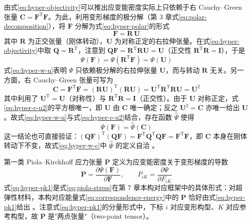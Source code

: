 由式\eqref{eq:hyper-objectivity}可以推出应变能密度实际上只依赖于右 Cauchy--Green 张量 $\mathbf{C}=\mathbf{F}^{\mathrm{T}}\mathbf{F}$。为此，利用变形梯度的极分解（第 3 章式\eqref{eq:polar-decomposition}），将 $\mathbf{F}$ 分解为式\eqref{eq:hyper-polar}的形式
\begin{equation}
  \mathbf{F}=\mathbf{R}\,\mathbf{U}
  \label{eq:hyper-polar}
\end{equation}
其中 $\mathbf{R}$ 为正交张量（刚体转动），$\mathbf{U}$ 为对称正定的右拉伸张量。在式\eqref{eq:hyper-objectivity}中取 $\mathbf{Q}=\mathbf{R}^{\mathrm{T}}$，注意到 $\mathbf{Q}\mathbf{F}=\mathbf{R}^{\mathrm{T}}\mathbf{R}\mathbf{U}=\mathbf{U}$（正交性 $\mathbf{R}^{\mathrm{T}}\mathbf{R}=\mathbf{I}$），于是
\begin{equation}
  \Psi(\mathbf{F})=\Psi(\mathbf{R}^{\mathrm{T}}\mathbf{F})=\Psi(\mathbf{U})
  \label{eq:hyper-w-u}
\end{equation}
式\eqref{eq:hyper-w-u}表明 $\Psi$ 只依赖极分解的右拉伸张量 $\mathbf{U}$，而与转动 $\mathbf{R}$ 无关。另一方面，右 Cauchy--Green 张量可写为
\begin{equation}
  \mathbf{C}=\mathbf{F}^{\mathrm{T}}\mathbf{F}=(\mathbf{R}\mathbf{U})^{\mathrm{T}}(\mathbf{R}\mathbf{U})
  =\mathbf{U}^{\mathrm{T}}\mathbf{R}^{\mathrm{T}}\mathbf{R}\mathbf{U}=\mathbf{U}^{2}
  \label{eq:hyper-c-u2}
\end{equation}
其中利用了 $\mathbf{U}^{\mathrm{T}}=\mathbf{U}$（对称性）与 $\mathbf{R}^{\mathrm{T}}\mathbf{R}=\mathbf{I}$（正交性）。由于 $\mathbf{U}$ 对称正定，式\eqref{eq:hyper-c-u2}的平方根唯一，即 $\mathbf{U}$ 由 $\mathbf{C}$ 唯一确定；反之 $\mathbf{U}^{2}=\mathbf{C}$ 亦唯一给出 $\mathbf{U}$。故式\eqref{eq:hyper-w-u}与式\eqref{eq:hyper-c-u2}结合，存在函数 $\hat{\Psi}$ 使得
\begin{equation}
  \Psi(\mathbf{F})=\hat{\Psi}(\mathbf{C})
  \label{eq:hyper-w-c}
\end{equation}
这一结论也可直接验证：$(\mathbf{Q}\mathbf{F})^{\mathrm{T}}(\mathbf{Q}\mathbf{F})=\mathbf{F}^{\mathrm{T}}\mathbf{Q}^{\mathrm{T}}\mathbf{Q}\mathbf{F}=\mathbf{F}^{\mathrm{T}}\mathbf{F}$，即 $\mathbf{C}$ 本身在刚体转动下不变，故式\eqref{eq:hyper-w-c}中 $\hat{\Psi}$ 的定义自洽 \cite{Ogden1997}。

第一类 Piola--Kirchhoff 应力张量 $\mathbf{P}$ 定义为应变能密度关于变形梯度的导数
\begin{equation}
  \mathbf{P}=\frac{\partial\Psi(\mathbf{F})}{\partial\mathbf{F}},
  \qquad
  P_{iK}=\frac{\partial\Psi}{\partial F_{iK}}
  \label{eq:hyper-pk1}
\end{equation}
式\eqref{eq:hyper-pk1}是式\eqref{eq:piola-stress}在第 7 章本构对应框架中的具体形式：对超弹性材料，本构对应能量式\eqref{eq:correspondence-energy}中的 $\mathbf{P}$ 恰好由式\eqref{eq:hyper-pk1}给出 \cite{Silling2007}。注意式\eqref{eq:hyper-pk1}的分量形式中，下标 $i$ 对应变形构型、$K$ 对应参考构型，故 $\mathbf{P}$ 是"两点张量"（two-point tensor）\cite{Ogden1997}。

